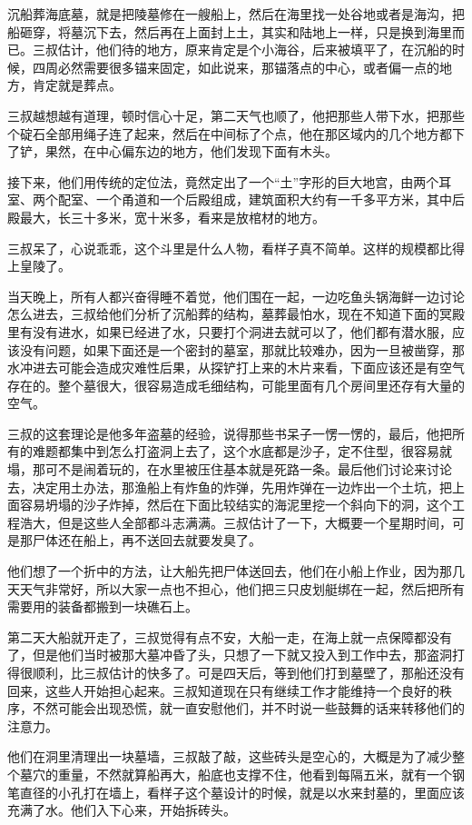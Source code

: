 沉船葬海底墓，就是把陵墓修在一艘船上，然后在海里找一处谷地或者是海沟，把船砸穿，将墓沉下去，然后再在上面封上土，其实和陆地上一样，只是换到海里而已。三叔估计，他们待的地方，原来肯定是个小海谷，后来被填平了，在沉船的时候，四周必然需要很多锚来固定，如此说来，那锚落点的中心，或者偏一点的地方，肯定就是葬点。

三叔越想越有道理，顿时信心十足，第二天气也顺了，他把那些人带下水，把那些个碇石全部用绳子连了起来，然后在中间标了个点，他在那区域内的几个地方都下了铲，果然，在中心偏东边的地方，他们发现下面有木头。

接下来，他们用传统的定位法，竟然定出了一个“土”字形的巨大地宫，由两个耳室、两个配室、一个甬道和一个后殿组成，建筑面积大约有一千多平方米，其中后殿最大，长三十多米，宽十米多，看来是放棺材的地方。

三叔呆了，心说乖乖，这个斗里是什么人物，看样子真不简单。这样的规模都比得上皇陵了。

当天晚上，所有人都兴奋得睡不着觉，他们围在一起，一边吃鱼头锅海鲜一边讨论怎么进去，三叔给他们分析了沉船葬的结构，墓葬最怕水，现在不知道下面的冥殿里有没有进水，如果已经进了水，只要打个洞进去就可以了，他们都有潜水服，应该没有问题，如果下面还是一个密封的墓室，那就比较难办，因为一旦被凿穿，那水冲进去可能会造成灾难性后果，从探铲打上来的木片来看，下面应该还是有空气存在的。整个墓很大，很容易造成毛细结构，可能里面有几个房间里还存有大量的空气。

三叔的这套理论是他多年盗墓的经验，说得那些书呆子一愣一愣的，最后，他把所有的难题都集中到怎么打盗洞上去了，这个水底都是沙子，定不住型，很容易就塌，那可不是闹着玩的，在水里被压住基本就是死路一条。最后他们讨论来讨论去，决定用土办法，那渔船上有炸鱼的炸弹，先用炸弹在一边炸出一个土坑，把上面容易坍塌的沙子炸掉，然后在下面比较结实的海泥里挖一个斜向下的洞，这个工程浩大，但是这些人全部都斗志满满。三叔估计了一下，大概要一个星期时间，可是那尸体还在船上，再不送回去就要发臭了。

他们想了一个折中的方法，让大船先把尸体送回去，他们在小船上作业，因为那几天天气非常好，所以大家一点也不担心，他们把三只皮划艇绑在一起，然后把所有需要用的装备都搬到一块礁石上。

第二天大船就开走了，三叔觉得有点不安，大船一走，在海上就一点保障都没有了，但是他们当时被那大墓冲昏了头，只想了一下就又投入到工作中去，那盗洞打得很顺利，比三叔估计的快多了。可是四天后，等到他们打到墓壁了，那船还没有回来，这些人开始担心起来。三叔知道现在只有继续工作才能维持一个良好的秩序，不然可能会出现恐慌，就一直安慰他们，并不时说一些鼓舞的话来转移他们的注意力。

他们在洞里清理出一块墓墙，三叔敲了敲，这些砖头是空心的，大概是为了减少整个墓穴的重量，不然就算船再大，船底也支撑不住，他看到每隔五米，就有一个钢笔直径的小孔打在墙上，看样子这个墓设计的时候，就是以水来封墓的，里面应该充满了水。他们入下心来，开始拆砖头。

